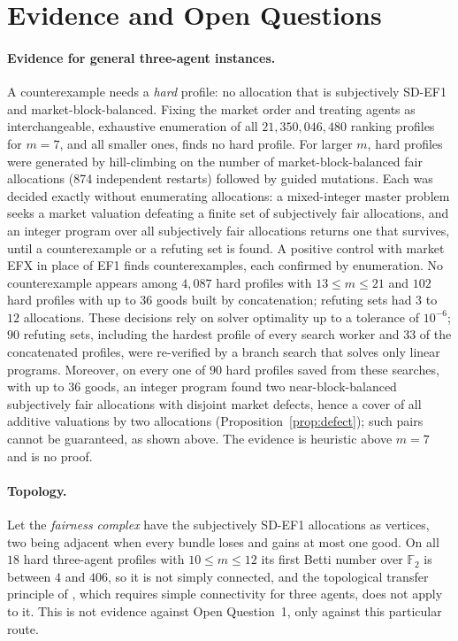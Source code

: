 \documentclass[sigconf,anonymous]{aamas}
\begin{document}
\section{Evidence and Open Questions}\label{sec:discussion}
\paragraph{Evidence for general three-agent instances.}
A counterexample needs a \emph{hard} profile: no allocation that is subjectively SD-EF1 and market-block-balanced. Fixing the market order and treating agents as interchangeable, exhaustive enumeration of all $21{,}350{,}046{,}480$ ranking profiles for $m=7$, and all smaller ones, finds no hard profile. For larger $m$, hard profiles were generated by hill-climbing on the number of market-block-balanced fair allocations (874 independent restarts) followed by guided mutations. Each was decided exactly without enumerating allocations: a mixed-integer master problem seeks a market valuation defeating a finite set of subjectively fair allocations, and an integer program over all subjectively fair allocations returns one that survives, until a counterexample or a refuting set is found. A positive control with market EFX in place of EF1 finds counterexamples, each confirmed by enumeration. No counterexample appears among $4{,}087$ hard profiles with $13\le m\le21$ and $102$ hard profiles with up to $36$ goods built by concatenation; refuting sets had $3$ to $12$ allocations. These decisions rely on solver optimality up to a tolerance of $10^{-6}$; $90$ refuting sets, including the hardest profile of every search worker and 33 of the concatenated profiles, were re-verified by a branch search that solves only linear programs. Moreover, on every one of $90$ hard profiles saved from these searches, with up to $36$ goods, an integer program found two near-block-balanced subjectively fair allocations with disjoint market defects, hence a cover of all additive valuations by two allocations (Proposition~\ref{prop:defect}); such pairs cannot be guaranteed, as shown above. The evidence is heuristic above $m=7$ and is no proof.

\paragraph{Topology.}
Let the \emph{fairness complex} have the subjectively SD-EF1 allocations as vertices, two being adjacent when every bundle loses and gains at most one good. On all $18$ hard three-agent profiles with $10\le m\le12$ its first Betti number over $\mathbb F_2$ is between $4$ and $406$, so it is not simply connected, and the topological transfer principle of \citet{dupre2026balanced}, which requires simple connectivity for three agents, does not apply to it. This is not evidence against Open Question~1, only against this particular route.
\end{document}

